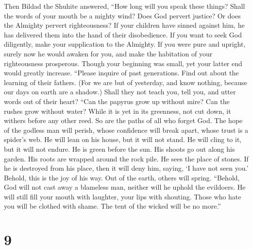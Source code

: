  Then Bildad the Shuhite answered,  ``How
long will you speak these things? Shall the words of your mouth be a
mighty wind?  Does God pervert justice? Or does the
Almighty pervert righteousness?  If your children have
sinned against him, he has delivered them into the hand of their
disobedience.  If you want to seek God diligently, make
your supplication to the Almighty.  If you were pure and
upright, surely now he would awaken for you, and make the habitation of
your righteousness prosperous.  Though your beginning was
small, yet your latter end would greatly increase. 
``Please inquire of past generations. Find out about the learning of
their fathers.  (For we are but of yesterday, and know
nothing, because our days on earth are a shadow.)  Shall
they not teach you, tell you, and utter words out of their heart?
 ``Can the papyrus grow up without mire? Can the rushes
grow without water?  While it is yet in its greenness,
not cut down, it withers before any other reed.  So are
the paths of all who forget God. The hope of the godless man will
perish,  whose confidence will break apart, whose trust
is a spider's web.  He will lean on his house, but it
will not stand. He will cling to it, but it will not endure.
 He is green before the sun. His shoots go out along his
garden.  His roots are wrapped around the rock pile. He
sees the place of stones.  If he is destroyed from his
place, then it will deny him, saying, `I have not seen you.'
 Behold, this is the joy of his way. Out of the earth,
others will spring.  ``Behold, God will not cast away a
blameless man, neither will he uphold the evildoers.  He
will still fill your mouth with laughter, your lips with shouting.
 Those who hate you will be clothed with shame. The tent
of the wicked will be no more.''

\hypertarget{section-8}{%
\section{9}\label{section-8}}

